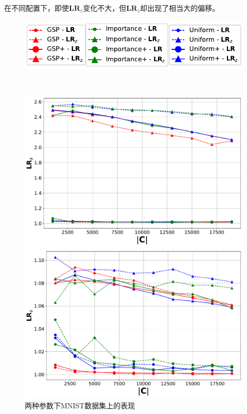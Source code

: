 在不同配置下，即使$\mathbf{LR}_z$变化不大，但$\mathbf{LR}_z$却出现了相当大的偏移。
\begin{figure}
  
  \centering
    \begin{minipage}{0.8\linewidth}
        \centering
        \includegraphics[width=\linewidth]{./fig/legend.pdf}
    \end{minipage}
    \\
    \begin{minipage}{0.49\linewidth}
        \centering
        \includegraphics[width=\linewidth]{./fig/loss_ratio(0.05,0.2) - MNIST.pdf}
    \end{minipage}
    \hfill
    \begin{minipage}{0.49\linewidth}
        \centering
        \includegraphics[width=\linewidth]{./fig/loss_ratio(0.2,0.05) - MNIST.pdf}
    \end{minipage}
    \caption{两种参数下MNIST数据集上的表现}
    \label{fig:mnist_combined}
\end{figure}

